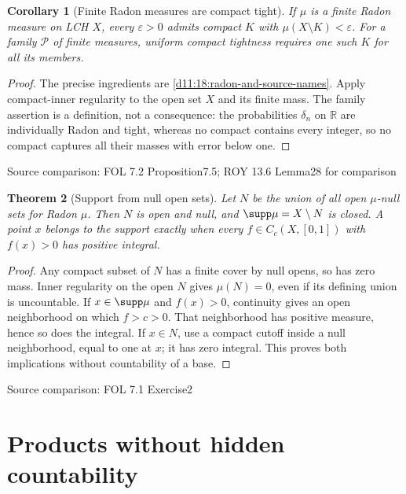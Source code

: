 \documentclass[11pt,oneside,openany]{book}
\newtheorem{theorem}{Theorem}[chapter]
\newtheorem{corollary}[theorem]{Corollary}
\theoremstyle{definition}
\theoremstyle{remark}
\newcommand{\R}{\mathbb R}\newcommand{\C}{\mathbb C}
\newcommand{\eps}{\varepsilon}\newcommand{\ee}{\varepsilon}
\newcommand{\family}[1]{}
\newcommand{\source}[1]{\par\begingroup\small\sffamily\color{black!65}Source comparison: #1\par\endgroup}
\begin{document}
\begin{corollary}[Finite Radon measures are compact tight]\family{D11.18.finite_radon_tightness}\label{d11:18:finite-radon-tightness}
If $\mu$ is a finite Radon measure on LCH $X$, every $\eps>0$ admits compact $K$ with $\mu(X\setminus K)<\eps$. For a family $\mathcal P$ of finite measures, \emph{uniform compact tightness} requires one such $K$ for all its members.
\end{corollary}
\begin{proof}
The precise ingredients are \cref{d11:18:radon-and-source-names}. Apply compact-inner regularity to the open set $X$ and its finite mass. The family assertion is a definition, not a consequence: the probabilities $\delta_n$ on $\R$ are individually Radon and tight, whereas no compact contains every integer, so no compact captures all their masses with error below one.
\end{proof}
\source{FOL 7.2 Proposition7.5; ROY 13.6 Lemma28 for comparison}

\begin{theorem}[Support from null open sets]\family{D11.18.radon_support}\label{d11:18:radon-support}
Let $N$ be the union of all open $\mu$-null sets for Radon $\mu$. Then $N$ is open and null, and $\supp\mu=X\setminus N$ is closed. A point $x$ belongs to the support exactly when every $f\in C_c(X,[0,1])$ with $f(x)>0$ has positive integral.
\end{theorem}
\begin{proof}
Any compact subset of $N$ has a finite cover by null opens, so has zero mass. Inner regularity on the open $N$ gives $\mu(N)=0$, even if its defining union is uncountable. If $x\in\supp\mu$ and $f(x)>0$, continuity gives an open neighborhood on which $f>c>0$. That neighborhood has positive measure, hence so does the integral. If $x\in N$, use a compact cutoff inside a null neighborhood, equal to one at $x$; it has zero integral. This proves both implications without countability of a base.
\end{proof}
\source{FOL 7.1 Exercise2}

\section{Products without hidden countability}
\end{document}
